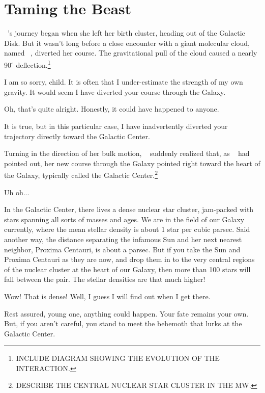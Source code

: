 \documentclass[main.tex]{subfiles}
\begin{document}
\chapter{Taming the Beast}


\newpara \nar \rmelectra~'s journey began when she left her birth cluster, heading out of the Galactic Disk.  But it wasn't long before a close encounter with a giant molecular cloud, named \rmaethra~, diverted her course.  The gravitational pull of the cloud caused a nearly 90$^{\circ}$ deflection.\footnote{INCLUDE DIAGRAM SHOWING THE EVOLUTION OF THE INTERACTION.}  

\newpara \Aethra I am so sorry, child.  It is often that I under-estimate the strength of my own gravity.  It would seem I have diverted your course through the Galaxy.

\newpara \Electra Oh, that's quite alright.  Honestly, it could have happened to anyone.

\newpara \Aethra It is true, but in this particular case, I have inadvertently diverted your trajectory directly toward the Galactic Center.

\newpara \nar Turning in the direction of her bulk motion, \rmelectra~ suddenly realized that, as \rmaethra~ had pointed out, her new course through the Galaxy pointed right toward the heart of the Galaxy, typically called the Galactic Center.\footnote{DESCRIBE THE CENTRAL NUCLEAR STAR CLUSTER IN THE MW.}

\newpara \Electra Uh oh...

\newpara \Aethra In the Galactic Center, there lives a dense nuclear star cluster, jam-packed with stars spanning all sorts of masses and ages.  We are in the field of our Galaxy currently, where the mean stellar density is about 1 star per cubic parsec.  Said another way, the distance separating the infamous Sun and her next nearest neighbor, Proxima Centauri, is about a parsec.  But if you take the Sun and Proxima Centauri as they are now, and drop them in to the very central regions of the nuclear cluster at the heart of our Galaxy, then more than 100 stars will fall between the pair.  The stellar densities are that much higher!

\newpara \Electra Wow!  That is dense!  Well, I guess I will find out when I get there.

\newpara \Aethra Rest assured, young one, anything could happen.  Your fate remains your own.  But, if you aren't careful, you stand to meet the behemoth that lurks at the Galactic Center.
\end{document}
